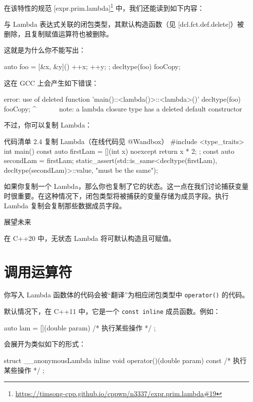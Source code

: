 在该特性的规范 [expr.prim.lambda]\footnote{\url{https://timsong-cpp.github.io/cppwp/n3337/expr.prim.lambda\#19}} 中，我们还能读到如下内容：

与 Lambda 表达式关联的闭包类型，其默认构造函数（见 [dcl.fct.def.delete]）被删除，且复制赋值运算符也被删除。

这就是为什么你不能写出：

\begin{codebox}
auto foo = [&x, &y]() { ++x; ++y; };
decltype(foo) fooCopy;
\end{codebox}

这在 GCC 上会产生如下错误：

\begin{codebox}
error: use of deleted function 'main()::<lambda()>::<lambda>()'
decltype(foo) fooCopy;
^~~~~~~
note: a lambda closure type has a deleted default constructor
\end{codebox}

不过，你可以复制 Lambda：

\begin{codeboxt}{代码清单 2.4 复制 Lambda（在线代码见 @Wandbox）}
#include <type_traits>
int main() {
const auto firstLam = [](int x) noexcept { return x * 2; };
const auto secondLam = firstLam;
static_assert(std::is_same<decltype(firstLam), decltype(secondLam)>::value,
"must be the same");
}
\end{codeboxt}

如果你复制一个 Lambda，那么你也复制了它的状态。这一点在我们讨论捕获变量时很重要。在这种情况下，闭包类型将被捕获的变量存储为成员字段。执行 Lambda 复制会复制那些数据成员字段。


展望未来

在 C++20 中，无状态 Lambda 将可默认构造且可赋值。

\section{调用运算符}

你写入 Lambda 函数体的代码会被“翻译”为相应闭包类型中 \texttt{operator()} 的代码。

默认情况下，在 C++11 中，它是一个 \texttt{const inline} 成员函数。例如：

\begin{codebox}
auto lam = [](double param) { /* 执行某些操作 */ };
\end{codebox}

会展开为类似如下的形式：

\begin{codebox}
struct __anonymousLambda {
inline void operator()(double param) const { /* 执行某些操作 */ }
};
\end{codebox}

